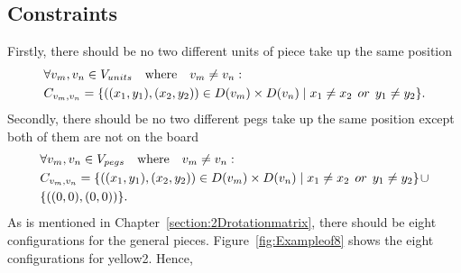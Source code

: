 \subsection{Constraints}
\label{section:IQtwistconstriant}
Firstly, there should be no two different units of piece take up the same position
\begin{equation}
\label{equ:firstconstrain}
\begin{aligned}
&\forall v_{m},v_{n} \in \VUnits\quad \text{where} \quad v_{m} \neq v_{n}:\\
&\Constraints{m}{n}=\{((x_{1},y_{1}),(x_{2},y_{2}))\in \Domain{m} \times \Domain{n}\mid x_{1} \neq x_{2}   \hspace{1ex} or \hspace{1ex}  y_{1} \neq y_{2}\}.
\end{aligned}
\end{equation}
Secondly, there should be no two different pegs take up the same position except both of them are not on the board
\begin{equation}
\label{equ:secondconstrain}
\begin{aligned}
&\forall v_{m},v_{n}\in \VPegs \quad \text{where} \quad v_{m} \neq v_{n}:\\
&\Constraints{m}{n}=\{((x_{1},y_{1}),(x_{2},y_{2}))\in \Domain{m}\times \Domain{n}\mid x_{1} \neq x_{2}   \hspace{1ex} or \hspace{1ex}  y_{1} \neq y_{2}\}\hspace{1pt}\cup \\
&\{((0,0),(0,0))\}.
\end{aligned}
\end{equation}
As is mentioned in Chapter~\ref{section:2Drotationmatrix}, there should be eight configurations for the general pieces. Figure~\ref{fig:Exampleof8} shows the eight configurations for yellow2. Hence,
